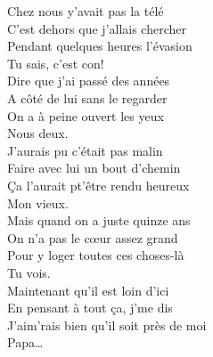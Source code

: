 \documentclass{novel}
\begin{document}
\begin{multicols}{2}
Chez nous y'avait pas la télé \\
C'est dehors que j'allais chercher \\
Pendant quelques heures l'évasion \\
Tu sais, c'est con! \\

Dire que j'ai passé des années \\
A côté de lui sans le regarder \\
On a à peine ouvert les yeux \\
Nous deux. \\

J'aurais pu c'était pas malin \\
Faire avec lui un bout d'chemin \\
Ça l'aurait pt'être rendu heureux \\
Mon vieux. \\

Mais quand on a juste quinze ans \\
On n'a pas le cœur assez grand \\
Pour y loger toutes ces choses-là \\
Tu vois. \\

Maintenant qu'il est loin d'ici \\
En pensant à tout ça, j'me dis \\
J'aim'rais bien qu'il soit près de moi \\
Papa… \\

\end{multicols}
\end{document}
